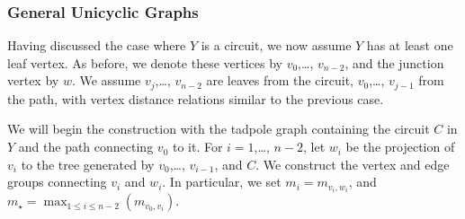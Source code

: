 \documentclass[12pt,leqno]{amsart}
\newcommand{\2}{L^2_{\rm per}(0, T)}
\numberwithin{equation}{section}
\numberwithin{figure}{section}
\begin{document}
\subsubsection{General Unicyclic Graphs}
Having discussed the case where $Y$ is a circuit, we now assume $Y$ has at least one leaf vertex. As before, we denote these vertices by $v_0$,\dots, $v_{n-2}$, and the junction vertex by $w$. We assume $v_j$,\dots, $v_{n-2}$ are leaves from the circuit, $v_0$,\dots, $v_{j-1}$ from the path, with vertex distance relations similar to the previous case.

We will begin the construction with the tadpole graph containing the circuit $C$ in $Y$ and the path connecting $v_0$ to it. For $i=1$,\dots, $n-2$, let $w_i$ be the projection of $v_i$ to the tree generated by $v_0$,\dots, $v_{i-1}$, and $C$. We construct the vertex and edge groups connecting $v_i$ and $w_i$. In particular, we set $m_i = m_{v_i,w_i}$, and $m_\star = \max_{1\leq i\leq n-2}(m_{v_0,v_i})$.
\end{document}
